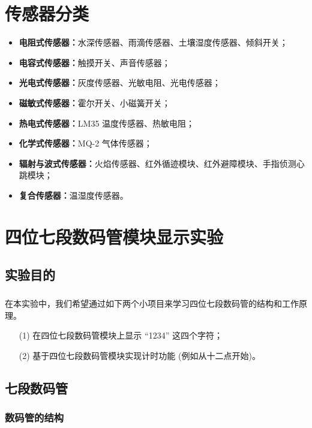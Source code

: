 \documentclass[UTF8, oneside]{ctexbook}
\begin{document}
\chapter*{传感器分类}
\begin{itemize}
    \item \textbf{电阻式传感器：}水深传感器、雨滴传感器、土壤湿度传感器、倾斜开关；
    \item \textbf{电容式传感器：}触摸开关、声音传感器；
    \item \textbf{光电式传感器：}灰度传感器、光敏电阻、光电传感器；
    \item \textbf{磁敏式传感器：}霍尔开关、小磁簧开关；
    \item \textbf{热电式传感器：}LM35 温度传感器、热敏电阻；
    \item \textbf{化学式传感器：}MQ-2 气体传感器；
    \item \textbf{辐射与波式传感器：}火焰传感器、红外循迹模块、红外避障模块、手指侦测心跳模块；
    \item \textbf{复合传感器：}温湿度传感器。
\end{itemize}

\chapter{四位七段数码管模块显示实验}

\section{实验目的}
\paragraph{}
在本实验中，我们希望通过如下两个小项目来学习四位七段数码管的结构和工作原理。
\begin{itemize}
    \item[(1)] 在四位七段数码管模块上显示 “1234” 这四个字符；
    \item[(2)] 基于四位七段数码管模块实现计时功能 (例如从十二点开始)。
\end{itemize}

\section{七段数码管}
\subsection{数码管的结构}
\end{document}
